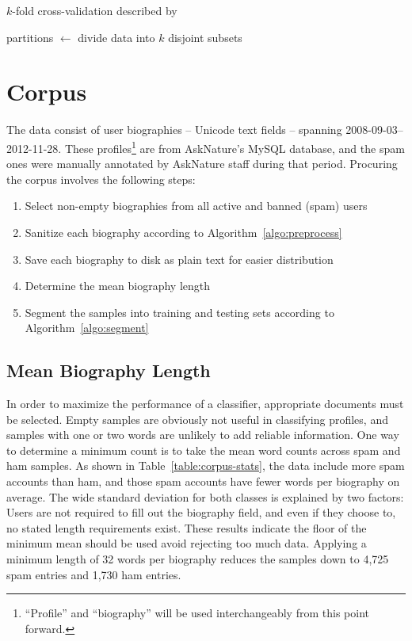 \documentclass[draft,10pt]{article}
\begin{document}
\begin{algorithm}[b]
  \caption{$k$-fold cross-validation described by~\cite[p147]{mitchell}}
  \begin{algorithmic}
    \State partitions $\gets$ divide data into $k$ disjoint subsets
    \State {}
    \EndFor
    \EndFunction
  \end{algorithmic}\label{algo:crossvalidation}
\end{algorithm}

\section{Corpus}
The data consist of user biographies -- Unicode text fields -- spanning
2008-09-03--2012-11-28. These profiles\footnote{``Profile'' and ``biography''
  will be used interchangeably from this point forward.} are from AskNature's
MySQL database, and the spam ones were manually annotated by AskNature staff
during that period. Procuring the corpus involves the following steps:

\begin{enumerate}
\item Select non-empty biographies from all active and banned (spam) users
\item Sanitize each biography according to Algorithm~\ref{algo:preprocess}
\item Save each biography to disk as plain text for easier distribution
\item Determine the mean biography length
\item Segment the samples into training and testing sets according to
  Algorithm~\ref{algo:segment}
\end{enumerate}

\subsection{Mean Biography Length}
In order to maximize the performance of a classifier, appropriate documents
must be selected. Empty samples are obviously not useful in classifying
profiles, and samples with one or two words are unlikely to add reliable
information. One way to determine a minimum count is to take the mean word
counts across spam and ham samples. As shown in
Table~\ref{table:corpus-stats}, the data include more spam accounts than ham,
and those spam accounts have fewer words per biography on average. The wide
standard deviation for both classes is explained by two factors: Users are not
required to fill out the biography field, and even if they choose to, no
stated length requirements exist. These results indicate the floor of the
minimum mean should be used avoid rejecting too much data. Applying a minimum
length of 32 words per biography reduces the samples down to 4,725 spam
entries and 1,730 ham entries.
\end{document}
